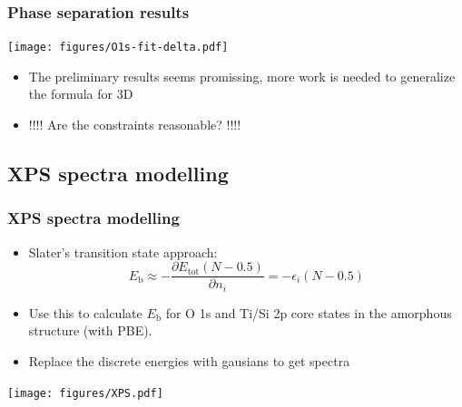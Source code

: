 \documentclass[noamsthm,8pt,t,xcolor={dvipsnames}]{beamer}
\begin{document}
\begin{frame}
   \frametitle{Phase separation results}
   \vspace{-0.3cm}
   \begin{center}
      \texttt{[image: figures/O1s-fit-delta.pdf]}
   \end{center}
   \begin{itemize}
      \item The preliminary results seems promissing, more work is needed to generalize the formula for 3D
      \item !!!! Are the constraints reasonable? !!!!
   \end{itemize}
\end{frame}

\subsection{XPS spectra modelling}

\begin{frame}
   \frametitle{XPS spectra modelling}
   \vspace{-0.3cm}
   \begin{itemize}
      \item Slater's transition state approach: $$E_\mathrm{b} \approx -\frac{ \partial E_\mathrm{tot}(N − 0.5)} { \partial n_i} = −\epsilon_i(N − 0.5)$$
      \item Use this to calculate $E_\mathrm{b}$ for O 1s and Ti/Si 2p core states in the amorphous structure (with PBE).
      \item Replace the discrete energies with gausians to get spectra
   \end{itemize}
   \begin{center}
      \texttt{[image: figures/XPS.pdf]}
   \end{center}
\end{frame}
\end{document}
